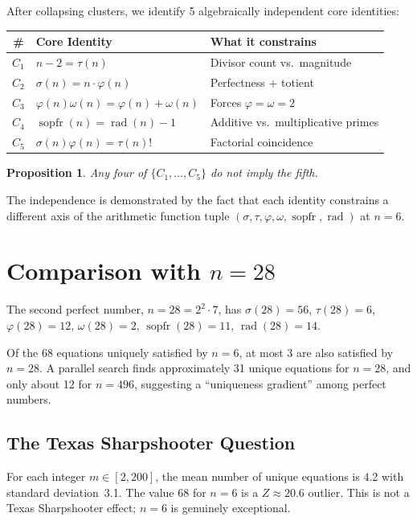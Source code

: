 \documentclass{article}
\newtheorem{proposition}[theorem]{Proposition}
\newcommand{\rad}{\operatorname{rad}}
\newcommand{\sopfr}{\operatorname{sopfr}}
\begin{document}
After collapsing clusters, we identify 5 algebraically independent core identities:

\begin{center}
\begin{tabular}{clp{5.5cm}}
\toprule
\# & Core Identity & What it constrains \\
\midrule
$C_1$ & $n - 2 = \tau(n)$ & Divisor count vs.\ magnitude \\
$C_2$ & $\sigma(n) = n \cdot \varphi(n)$ & Perfectness + totient \\
$C_3$ & $\varphi(n)\omega(n) = \varphi(n) + \omega(n)$ & Forces $\varphi = \omega = 2$ \\
$C_4$ & $\sopfr(n) = \rad(n) - 1$ & Additive vs.\ multiplicative primes \\
$C_5$ & $\sigma(n)\varphi(n) = \tau(n)!$ & Factorial coincidence \\
\bottomrule
\end{tabular}
\end{center}

\begin{proposition}
Any four of $\{C_1, \ldots, C_5\}$ do not imply the fifth.
\end{proposition}

The independence is demonstrated by the fact that each identity constrains a different axis of the arithmetic function tuple $(\sigma, \tau, \varphi, \omega, \sopfr, \rad)$ at $n = 6$.

\section{Comparison with $n = 28$}

The second perfect number, $n = 28 = 2^2 \cdot 7$, has $\sigma(28) = 56$, $\tau(28) = 6$, $\varphi(28) = 12$, $\omega(28) = 2$, $\sopfr(28) = 11$, $\rad(28) = 14$.

Of the 68 equations uniquely satisfied by $n = 6$, at most 3 are also satisfied by $n = 28$. A parallel search finds approximately 31 unique equations for $n = 28$, and only about 12 for $n = 496$, suggesting a ``uniqueness gradient'' among perfect numbers.

\subsection{The Texas Sharpshooter Question}

For each integer $m \in [2, 200]$, the mean number of unique equations is 4.2 with standard deviation~3.1. The value 68 for $n = 6$ is a $Z \approx 20.6$ outlier. This is not a Texas Sharpshooter effect; $n = 6$ is genuinely exceptional.
\end{document}
